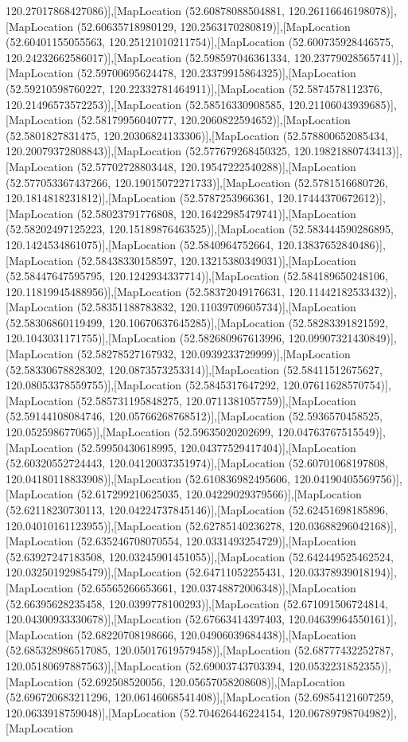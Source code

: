 120.27017868427086)],[MapLocation (52.60878088504881, 120.26116646198078)],[MapLocation (52.60635718980129, 120.2563170280819)],[MapLocation (52.60401155055563, 120.25121010211754)],[MapLocation (52.600735928446575, 120.24232662586017)],[MapLocation (52.598597046361334, 120.23779028565741)],[MapLocation (52.59700695624478, 120.23379915864325)],[MapLocation (52.59210598760227, 120.22332781464911)],[MapLocation (52.5874578112376, 120.21496573572253)],[MapLocation (52.58516330908585, 120.21106043939685)],[MapLocation (52.58179956040777, 120.2060822594652)],[MapLocation (52.5801827831475, 120.20306824133306)],[MapLocation (52.578800652085434, 120.20079372808843)],[MapLocation (52.577679268450325, 120.19821880743413)],[MapLocation (52.57702728803448, 120.19547222540288)],[MapLocation (52.577053367437266, 120.19015072271733)],[MapLocation (52.5781516680726, 120.1814818231812)],[MapLocation (52.5787253966361, 120.17444370672612)],[MapLocation (52.58023791776808, 120.16422985479741)],[MapLocation (52.58202497125223, 120.15189876463525)],[MapLocation (52.583444590286895, 120.1424534861075)],[MapLocation (52.5840964752664, 120.13837652840486)],[MapLocation (52.58438330158597, 120.13215380349031)],[MapLocation (52.58447647595795, 120.1242934337714)],[MapLocation (52.584189650248106, 120.11819945488956)],[MapLocation (52.58372049176631, 120.11442182533432)],[MapLocation (52.58351188783832, 120.11039709605734)],[MapLocation (52.58306860119499, 120.10670637645285)],[MapLocation (52.58283391821592, 120.1043031171755)],[MapLocation (52.582680967613996, 120.09907321430849)],[MapLocation (52.58278527167932, 120.0939233729999)],[MapLocation (52.58330678828302, 120.0873573253314)],[MapLocation (52.58411512675627, 120.08053378559755)],[MapLocation (52.5845317647292, 120.07611628570754)],[MapLocation (52.585731195848275, 120.0711381057759)],[MapLocation (52.59144108084746, 120.05766268768512)],[MapLocation (52.5936570458525, 120.052598677065)],[MapLocation (52.59635020202699, 120.04763767515549)],[MapLocation (52.59950430618995, 120.04377529417404)],[MapLocation (52.60320552724443, 120.04120037351974)],[MapLocation (52.60701068197808, 120.04180118833908)],[MapLocation (52.610836982495606, 120.04190405569756)],[MapLocation (52.617299210625035, 120.04229029379566)],[MapLocation (52.62118230730113, 120.04224737845146)],[MapLocation (52.62451698185896, 120.04010161123955)],[MapLocation (52.62785140236278, 120.03688296042168)],[MapLocation (52.635246708070554, 120.0331493254729)],[MapLocation (52.63927247183508, 120.03245901451055)],[MapLocation (52.642449525462524, 120.03250192985479)],[MapLocation (52.64711052255431, 120.03378939018194)],[MapLocation (52.65565266653661, 120.03748872006348)],[MapLocation (52.66395628235458, 120.0399778100293)],[MapLocation (52.671091506724814, 120.04300933330678)],[MapLocation (52.67663414397403, 120.04639964550161)],[MapLocation (52.68220708198666, 120.04906039684438)],[MapLocation (52.685328986517085, 120.05017619579458)],[MapLocation (52.68777432252787, 120.05180697887563)],[MapLocation (52.69003743703394, 120.0532231852355)],[MapLocation (52.692508520056, 120.05657058208608)],[MapLocation (52.696720683211296, 120.06146068541408)],[MapLocation (52.69854121607259, 120.0633918759048)],[MapLocation (52.704626446224154, 120.06789798704982)],[MapLocation 